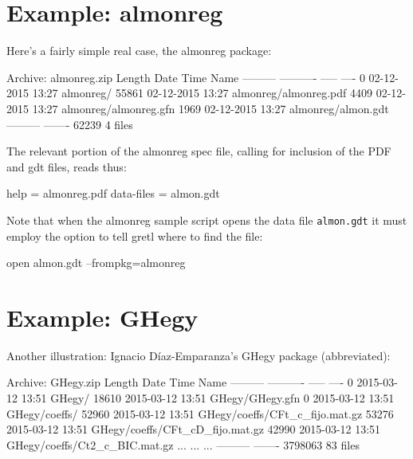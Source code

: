 \documentclass[oneside]{book}
\begin{document}
\section{Example: \textsf{almonreg}}

Here's a fairly simple real case, the \textsf{almonreg} package:

\begin{code}
Archive:  almonreg.zip
  Length      Date    Time    Name
---------  ---------- -----   ----
        0  02-12-2015 13:27   almonreg/
    55861  02-12-2015 13:27   almonreg/almonreg.pdf
     4409  02-12-2015 13:27   almonreg/almonreg.gfn
     1969  02-12-2015 13:27   almonreg/almon.gdt
---------                     -------
    62239                     4 files
\end{code}

The relevant portion of the \textsf{almonreg} spec file, calling for
inclusion of the PDF and gdt files, reads thus:

\begin{code}
help = almonreg.pdf
data-files = almon.gdt
\end{code}

Note that when the \textsf{almonreg} sample script opens the data file
\texttt{almon.gdt} it must employ the  option to tell
gretl where to find the file:

\begin{code}
open almon.gdt --frompkg=almonreg
\end{code}

\section{Example: \textsf{GHegy}}

Another illustration: Ignacio D\'iaz-Emparanza's \textsf{GHegy}
package (abbreviated):
%
\begin{code}
Archive:  GHegy.zip
  Length      Date    Time    Name
---------  ---------- -----   ----
        0  2015-03-12 13:51   GHegy/
    18610  2015-03-12 13:51   GHegy/GHegy.gfn
        0  2015-03-12 13:51   GHegy/coeffs/
    52960  2015-03-12 13:51   GHegy/coeffs/CFt_c_fijo.mat.gz
    53276  2015-03-12 13:51   GHegy/coeffs/CFt_cD_fijo.mat.gz
    42990  2015-03-12 13:51   GHegy/coeffs/Ct2_c_BIC.mat.gz
    ...    ...                ...
---------                     -------
  3798063                     83 files
\end{code}
\end{document}
